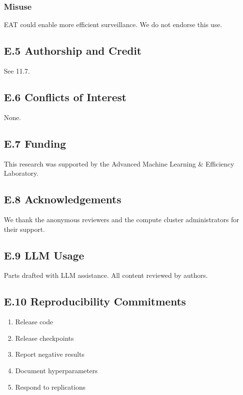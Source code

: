 \subsubsection{Misuse}

EAT could enable more efficient surveillance. We do not endorse this use.

\subsection{E.5 Authorship and Credit}

See  11.7.

\subsection{E.6 Conflicts of Interest}

None.

\subsection{E.7 Funding}

This research was supported by the Advanced Machine Learning \& Efficiency Laboratory.

\subsection{E.8 Acknowledgements}

We thank the anonymous reviewers and the compute cluster administrators for their support.

\subsection{E.9 LLM Usage}

Parts drafted with LLM assistance. All content reviewed by authors.

\subsection{E.10 Reproducibility Commitments}

\begin{enumerate}
\item Release code
\item Release checkpoints
\item Report negative results
\item Document hyperparameters
\item Respond to replications

\end{enumerate}
